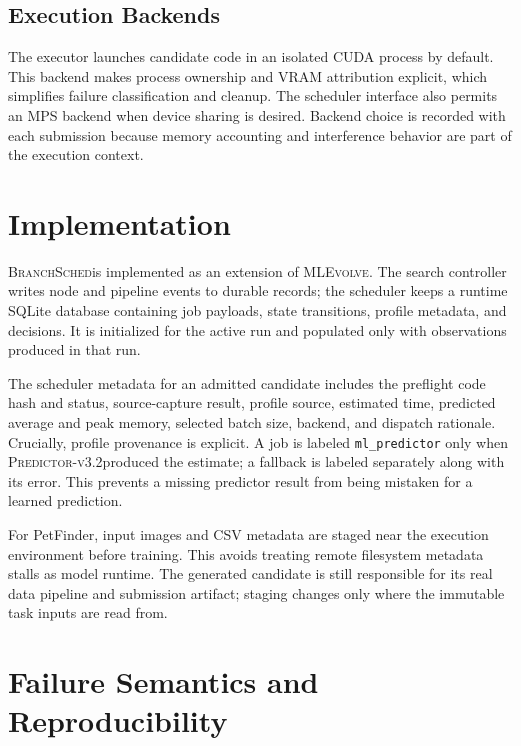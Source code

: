 \documentclass{article}
\newcommand{\method}{\textsc{BranchSched}}
\newcommand{\mlevolve}{\textsc{MLEvolve}}
\newcommand{\predictor}{\textsc{Predictor-v3.2}}
\begin{document}
\subsection{Execution Backends}

The executor launches candidate code in an isolated CUDA process by default. This backend makes process ownership and VRAM attribution explicit, which simplifies failure classification and cleanup. The scheduler interface also permits an MPS backend when device sharing is desired. Backend choice is recorded with each submission because memory accounting and interference behavior are part of the execution context.

\section{Implementation}
\label{sec:implementation}

\method is implemented as an extension of \mlevolve. The search controller writes node and pipeline events to durable records; the scheduler keeps a runtime SQLite database containing job payloads, state transitions, profile metadata, and decisions. It is initialized for the active run and populated only with observations produced in that run.

The scheduler metadata for an admitted candidate includes the preflight code hash and status, source-capture result, profile source, estimated time, predicted average and peak memory, selected batch size, backend, and dispatch rationale. Crucially, profile provenance is explicit. A job is labeled \texttt{ml\_predictor} only when \predictor produced the estimate; a fallback is labeled separately along with its error. This prevents a missing predictor result from being mistaken for a learned prediction.

For PetFinder, input images and CSV metadata are staged near the execution environment before training. This avoids treating remote filesystem metadata stalls as model runtime. The generated candidate is still responsible for its real data pipeline and submission artifact; staging changes only where the immutable task inputs are read from.

\section{Failure Semantics and Reproducibility}
\label{sec:failures}
\end{document}
